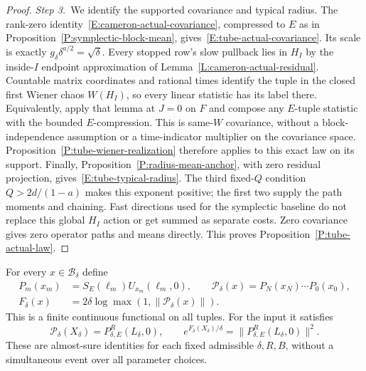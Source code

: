 \begin{proof}
  \medskip
  \noindent\textit{Step 3.~}We identify the supported covariance and typical
  radius.
  The rank-zero identity~\eqref{E:cameron-actual-covariance}, compressed to $E$
  as in Proposition~\ref{P:symplectic-block-mean},
  gives~\eqref{E:tube-actual-covariance}. Its scale is exactly
  $g_\delta\delta^{a/2} = \sqrt\delta$. Every stopped row's slow pullback lies
  in $H_I$ by the inside-$I$ endpoint approximation of
  Lemma~\ref{L:cameron-actual-residual}. Countable matrix coordinates and
  rational times identify the tuple in the closed first Wiener chaos $W(H_I)$,
  so every linear statistic has its label there. Equivalently, apply that lemma
  at $J = 0$ on $F$ and compose any $E$-tuple statistic with the bounded
  $E$-compression. This is same-$W$ covariance, without a block-independence
  assumption or a time-indicator multiplier on the covariance space.
  Proposition~\ref{P:tube-wiener-realization} therefore applies to this exact
  law on its support. Finally, Proposition~\ref{P:radius-mean-anchor}, with zero
  residual projection, gives~\eqref{E:tube-typical-radius}. The third fixed-$Q$
  condition $Q > 2d/(1-a)$ makes this exponent positive; the first two supply
  the path moments and chaining. Fast directions used for the symplectic
  baseline do not replace this global $H_I$ action or get summed as separate
  costs. Zero covariance gives zero operator paths and means directly. This
  proves Proposition~\ref{P:tube-actual-law}.
\end{proof}

\begin{lemma}\label{L:tube-actual-endpoint}
  For every $x \in \mathscr{B}_\delta$ define
  \[
    \begin{aligned}
      P_m(x_m)&=S_E(\ell_m)U_{x_m}(\ell_m,0),\qquad
      \mathcal{P}_\delta(x)=P_N(x_N)\cdots P_0(x_0),\\
      F_\delta(x)&=2\delta\log\max(1,\|\mathcal{P}_\delta(x)\|).
    \end{aligned}
  \]
  This is a finite continuous functional on all tuples. For the input it
  satisfies
  \begin{equation}\label{E:tube-global-endpoint}
    \mathcal{P}_\delta(X_\delta)
    =P_{\delta,E}^R(L_\delta,0),\qquad
    e^{F_\delta(X_\delta)/\delta}
    =\|P_{\delta,E}^R(L_\delta,0)\|^2 .
  \end{equation}
  These are almost-sure identities for each fixed admissible $\delta,R,B$,
  without a simultaneous event over all parameter choices.
\end{lemma}

